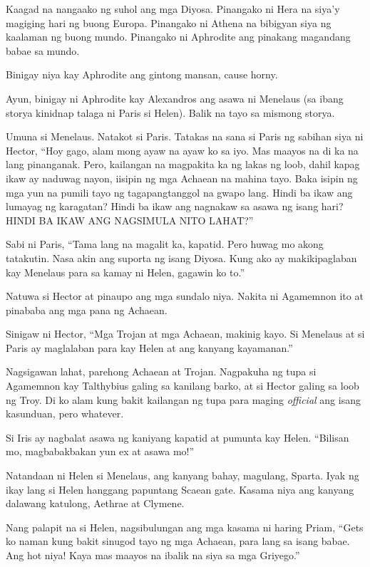\documentclass[12pt,letterpaper]{report}
\begin{document}
Kaagad na nangaako ng suhol ang mga Diyosa. Pinangako ni Hera na siya'y magiging hari ng buong Europa. Pinangako ni Athena na bibigyan siya ng kaalaman ng buong mundo. Pinangako ni Aphrodite ang pinakang magandang babae sa mundo.

Binigay niya kay Aphrodite ang gintong mansan, cause horny.

Ayun, binigay ni Aphrodite kay Alexandros ang asawa ni Menelaus (sa ibang storya kinidnap talaga ni Paris si Helen). Balik na tayo sa mismong storya.

Umuna si Menelaus. Natakot si Paris. Tatakas na sana si Paris ng sabihan siya ni Hector, ``Hoy gago, alam mong ayaw na ayaw ko sa iyo. Mas maayos na di ka na lang pinanganak. Pero, kailangan na magpakita ka ng lakas ng loob, dahil kapag ikaw ay naduwag nayon, iisipin ng mga Achaean na mahina tayo. Baka isipin ng mga yun na pumili tayo ng tagapangtanggol na gwapo lang. Hindi ba ikaw ang lumayag ng karagatan? Hindi ba ikaw ang nagnakaw sa asawa ng isang hari? HINDI BA IKAW ANG NAGSIMULA NITO LAHAT?''

Sabi ni Paris, ``Tama lang na magalit ka, kapatid. Pero huwag mo akong tatakutin. Nasa akin ang suporta ng isang Diyosa. Kung ako ay makikipaglaban kay Menelaus para sa kamay ni Helen, gagawin ko to.''

Natuwa si Hector at pinaupo ang mga sundalo niya. Nakita ni Agamemnon ito at pinababa ang mga pana ng Achaean.

Sinigaw ni Hector, ``Mga Trojan at mga Achaean, makinig kayo. Si Menelaus at si Paris ay maglalaban para kay Helen at ang kanyang kayamanan.''

Nagsigawan lahat, parehong Achaean at Trojan. Nagpakuha ng tupa si Agamemnon kay Talthybius galing sa kanilang barko, at si Hector galing sa loob ng Troy. Di ko alam kung bakit kailangan ng tupa para maging \textit{official} ang isang kasunduan, pero whatever.

Si Iris ay nagbalat asawa ng kaniyang kapatid at pumunta kay Helen. ``Bilisan mo, magbabakbakan yun ex at asawa mo!''

Natandaan ni Helen si Menelaus, ang kanyang bahay, magulang, Sparta. Iyak ng ikay lang si Helen hanggang papuntang Scaean gate. Kasama niya ang kanyang dalawang katulong, Aethrae at Clymene.

Nang palapit na si Helen, nagsibulungan ang mga kasama ni haring Priam, ``Gets ko naman kung bakit sinugod tayo ng mga Achaean, para lang sa isang babae. Ang hot niya! Kaya mas maayos na ibalik na siya sa mga Griyego.''
\end{document}
